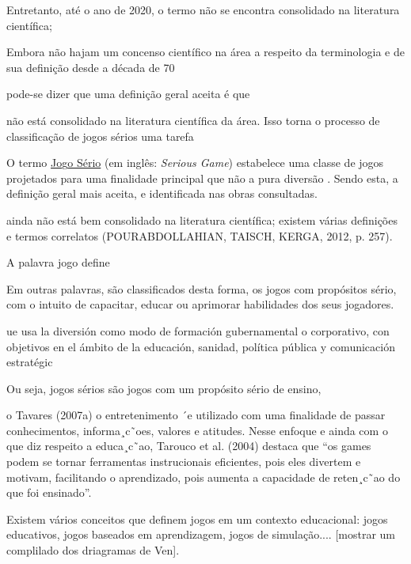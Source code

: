 Entretanto, até o ano de 2020, o termo não se encontra consolidado na literatura científica;


Embora não hajam um concenso científico na área a respeito da terminologia e de sua definição desde a década de 70



pode-se dizer que uma definição geral aceita é que 



não está consolidado na literatura científica da área. Isso torna o processo de classificação de jogos sérios uma tarefa 


O termo \underline{Jo}g\underline{o Sério} (em inglês: \textit{Serious Game}) estabelece uma classe de jogos projetados para uma finalidade principal que não a pura diversão \cite{michael2005serious}. Sendo esta, a definição geral mais aceita, e identificada nas obras consultadas. 



ainda não está bem consolidado na literatura científica; existem várias definições e termos correlatos (POURABDOLLAHIAN, TAISCH, KERGA, 2012, p. 257).




A palavra jogo define 



Em outras palavras, são classificados desta forma, os jogos com propósitos sério, com o intuito de capacitar, educar ou aprimorar habilidades dos seus jogadores. 



ue usa la diversión como modo de formación gubernamental o corporativo, con objetivos en el ámbito de la educación, sanidad, política pública y comunicación estratégic


Ou seja, jogos sérios são jogos com um propósito sério de ensino, 


o Tavares (2007a) o entretenimento ´e utilizado com uma finalidade de passar conhecimentos, informa¸c˜oes, valores e
atitudes.%
Nesse enfoque e ainda com o que diz respeito a educa¸c˜ao, Tarouco et al. (2004) destaca que “os games podem se tornar ferramentas instrucionais eficientes, pois eles divertem e motivam, facilitando o aprendizado, pois aumenta a capacidade de reten¸c˜ao do que foi ensinado”.


Existem vários conceitos que definem jogos em um contexto educacional: jogos educativos, jogos baseados em aprendizagem, jogos de simulação.... [mostrar um complilado dos driagramas de Ven].

